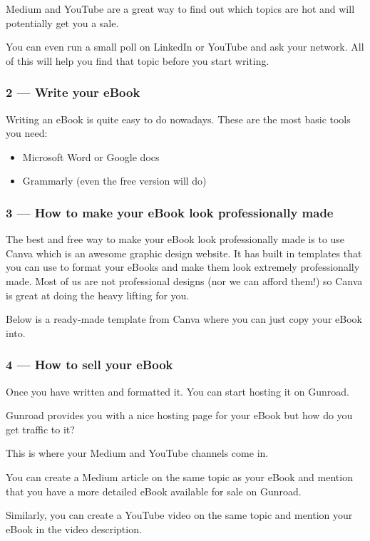 \documentclass[11pt]{article}
\begin{document}
Medium and YouTube are a great way to find out which topics are hot and will potentially get you a sale.

You can even run a small poll on LinkedIn or YouTube and ask your network. All of this will help you find that topic before you start writing.

\subsubsection*{2 — Write your eBook}
Writing an eBook is quite easy to do nowadays. These are the most basic tools you need:

\begin{itemize}
\item Microsoft Word or Google docs
\item Grammarly (even the free version will do)
\end{itemize}

\subsubsection*{3 — How to make your eBook look professionally made}
The best and free way to make your eBook look professionally made is to use Canva which is an awesome graphic design website. It has built in templates that you can use to format your eBooks and make them look extremely professionally made. Most of us are not professional designs (nor we can afford them!) so Canva is great at doing the heavy lifting for you.

Below is a ready-made template from Canva where you can just copy your eBook into.

\subsubsection*{4 — How to sell your eBook}
Once you have written and formatted it. You can start hosting it on Gunroad.

Gunroad provides you with a nice hosting page for your eBook but how do you get traffic to it?

This is where your Medium and YouTube channels come in.

You can create a Medium article on the same topic as your eBook and mention that you have a more detailed eBook available for sale on Gunroad.

Similarly, you can create a YouTube video on the same topic and mention your eBook in the video description.
\end{document}
